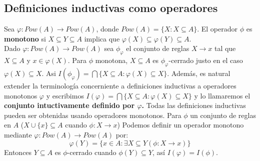 \documentclass[executivepaper]{article}
\begin{document}
\subsection{Definiciones inductivas como operadores}
Sea $\varphi:Pow(A)\rightarrow Pow(A)$, donde $Pow(A)=\{X:X\subseteq A\}$. El operador $\phi$ es \textbf{monotono} si $X\subseteq Y \subseteq A$ implica que $\varphi(X)\subseteq \varphi(Y) \subseteq A$.\\ 
Dado $\varphi:Pow(A)\rightarrow Pow(A)$ sea $\phi_{\varphi}$ el conjunto de reglas $X\rightarrow x$ tal que $X\subseteq A$ y $x \in \varphi(X)$. Para $\phi$ monotona, $X \subseteq A$ es $\phi_{\varphi}$-cerrado justo en el caso $\varphi(X) \subseteq X$. Asi $I(\phi_{\varphi})=\bigcap\{X \subseteq A: \varphi(X) \subseteq X\}$. Además, es natural extender la terminología concerniente a definiciones inductivas a operadores monotonos $\varphi$ y escribimos $I(\varphi)=\bigcap\{X \subseteq A: \varphi(X) \subseteq X\}$ y lo llamaremos el \textbf{conjunto intuctivamente definido por $\varphi$.} Todas las definiciones inductivas pueden ser obtenidas usando operadores monotonos. Para $\phi$ un conjunto de reglas en $A$ ($X\cup\{x\}\subseteq A$ cuando $\phi:X\rightarrow x$) Podemos definir un operador monotono mediante $\varphi:Pow(A)\rightarrow Pow(A)$ por:
$$\varphi(Y)=\{x\in A:\exists X\subseteq Y (\phi:X\rightarrow x)\}$$
Entonces $Y\subseteq A$ es $\phi$-cerrado cuando $\phi(Y)\subseteq Y$, así $I(\varphi)=I(\phi)$.\\
\end{document}
